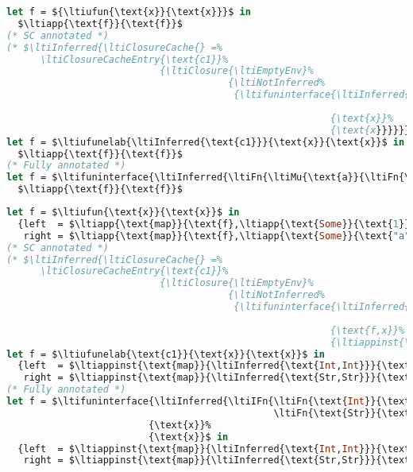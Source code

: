 {
\begin{lstlisting}[language=ml,mathescape=true]
let f = ${\ltiufun{\text{x}}{\text{x}}}$ in
  $\ltiapp{\text{f}}{\text{f}}$
(* SC annotated *)
(* $\ltiInferred{\ltiClosureCache{} =%
      \ltiClosureCacheEntry{\text{c1}}%
                           {\ltiClosure{\ltiEmptyEnv}%
                                       {\ltiNotInferred%
                                        {\ltifuninterface{\ltiInferred{\ltiFn{\ltiClosureWithStkIDParens{\ltiEmptyEnv}{\text{c1}}{\ltiufun{\text{x}}{\text{x}}}}%
                                                                             {\ltiClosureWithStkIDParens{\ltiEmptyEnv}{\text{c1}}{\ltiufun{\text{x}}{\text{x}}}}}}%
                                                         {\text{x}}%
                                                         {\text{x}}}}}}$ *)
let f = $\ltiufunelab{\ltiInferred{\text{c1}}}{\text{x}}{\text{x}}$ in
  $\ltiapp{\text{f}}{\text{f}}$
(* Fully annotated *)
let f = $\ltifuninterface{\ltiInferred{\ltiFn{\ltiMu{\text{a}}{\ltiFn{\text{a}}{\text{a}}}}{\ltiMu{\text{a}}{\ltiFn{\text{a}}{\text{a}}}}}}{\text{x}}{\text{x}}$ in
  $\ltiapp{\text{f}}{\text{f}}$
\end{lstlisting}
}

{
\begin{lstlisting}[language=ml,mathescape=true]
let f = $\ltiufun{\text{x}}{\text{x}}$ in
  {left  = $\ltiapp{\text{map}}{\text{f},\ltiapp{\text{Some}}{\text{1}}}$,
   right = $\ltiapp{\text{map}}{\text{f},\ltiapp{\text{Some}}{\text{"a"}}}$}
(* SC annotated *)
(* $\ltiInferred{\ltiClosureCache{} =%
      \ltiClosureCacheEntry{\text{c1}}%
                           {\ltiClosure{\ltiEmptyEnv}%
                                       {\ltiNotInferred%
                                        {\ltifuninterface{\ltiInferred{\ltiIFn{\ltiFn{\text{Int}}{\text{Int}}%
                                                                               \ltiFn{\text{Str}}{\text{Str}}}}}%
                                                         {\text{f,x}}%
                                                         {\ltiappinst{\text{f}}{\ltiInferred{\text{Int}}}{\text{x}}}}}}}$ *)
let f = $\ltiufunelab{\text{c1}}{\text{x}}{\text{x}}$ in
  {left  = $\ltiappinst{\text{map}}{\ltiInferred{\text{Int,Int}}}{\text{f},\ltiappinst{\text{Some}}{\ltiInferred{\text{Int}}}{\text{1}}}$,
   right = $\ltiappinst{\text{map}}{\ltiInferred{\text{Str,Str}}}{\text{f},\ltiappinst{\text{Some}}{\ltiInferred{\text{Str}}}{\text{"a"}}}$}
(* Fully annotated *)
let f = $\ltifuninterface{\ltiInferred{\ltiIFn{\ltiFn{\text{Int}}{\text{Int}}%
                                               \ltiFn{\text{Str}}{\text{Str}}}}}%
                         {\text{x}}%
                         {\text{x}}$ in
  {left  = $\ltiappinst{\text{map}}{\ltiInferred{\text{Int,Int}}}{\text{f},\ltiappinst{\text{Some}}{\ltiInferred{\text{Int}}}{\text{1}}}$,
   right = $\ltiappinst{\text{map}}{\ltiInferred{\text{Str,Str}}}{\text{f},\ltiappinst{\text{Some}}{\ltiInferred{\text{Str}}}{\text{"a"}}}$}
\end{lstlisting}
}


